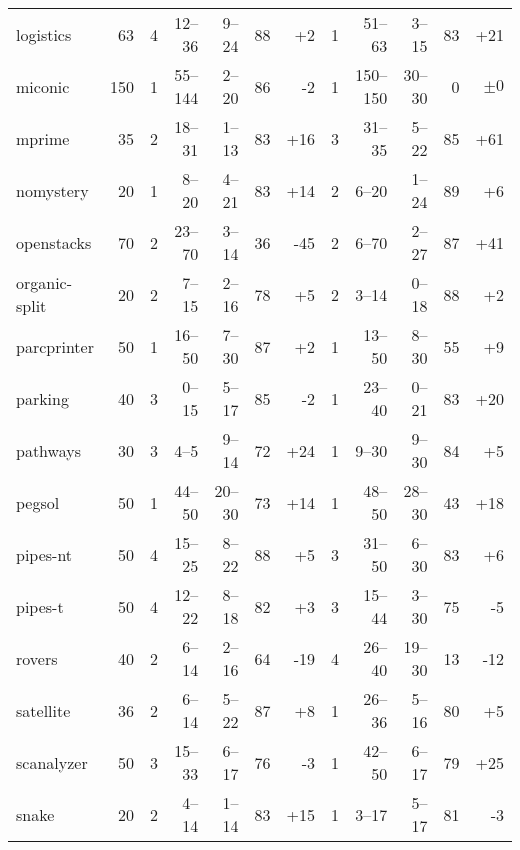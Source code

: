\documentclass{article}
\begin{document}
\begin{table}[h]
\begin{tabular}{@{}lr|rrrrr|rrrrr@{}}
    logistics &    63 &   4 &  12--36 &  9--24 & 88 &  {\color{blue}+2} &   1 &   51--63 &  3--15 & 83 & {\color{blue}+21} \\
      miconic &   150 &   1 & 55--144 &  2--20 & 86 &   {\color{red}-2} &   1 & 150--150 & 30--30 &  0 &           $\pm 0$ \\
       mprime &    35 &   2 &  18--31 &  1--13 & 83 & {\color{blue}+16} &   3 &   31--35 &  5--22 & 85 & {\color{blue}+61} \\
    nomystery &    20 &   1 &   8--20 &  4--21 & 83 & {\color{blue}+14} &   2 &    6--20 &  1--24 & 89 &  {\color{blue}+6} \\
   openstacks &    70 &   2 &  23--70 &  3--14 & 36 &  {\color{red}-45} &   2 &    6--70 &  2--27 & 87 & {\color{blue}+41} \\
organic-split &    20 &   2 &   7--15 &  2--16 & 78 &  {\color{blue}+5} &   2 &    3--14 &  0--18 & 88 &  {\color{blue}+2} \\
  parcprinter &    50 &   1 &  16--50 &  7--30 & 87 &  {\color{blue}+2} &   1 &   13--50 &  8--30 & 55 &  {\color{blue}+9} \\
      parking &    40 &   3 &   0--15 &  5--17 & 85 &   {\color{red}-2} &   1 &   23--40 &  0--21 & 83 & {\color{blue}+20} \\
     pathways &    30 &   3 &    4--5 &  9--14 & 72 & {\color{blue}+24} &   1 &    9--30 &  9--30 & 84 &  {\color{blue}+5} \\
       pegsol &    50 &   1 &  44--50 & 20--30 & 73 & {\color{blue}+14} &   1 &   48--50 & 28--30 & 43 & {\color{blue}+18} \\
     pipes-nt &    50 &   4 &  15--25 &  8--22 & 88 &  {\color{blue}+5} &   3 &   31--50 &  6--30 & 83 &  {\color{blue}+6} \\
      pipes-t &    50 &   4 &  12--22 &  8--18 & 82 &  {\color{blue}+3} &   3 &   15--44 &  3--30 & 75 &   {\color{red}-5} \\
       rovers &    40 &   2 &   6--14 &  2--16 & 64 &  {\color{red}-19} &   4 &   26--40 & 19--30 & 13 &  {\color{red}-12} \\
    satellite &    36 &   2 &   6--14 &  5--22 & 87 &  {\color{blue}+8} &   1 &   26--36 &  5--16 & 80 &  {\color{blue}+5} \\
   scanalyzer &    50 &   3 &  15--33 &  6--17 & 76 &   {\color{red}-3} &   1 &   42--50 &  6--17 & 79 & {\color{blue}+25} \\
        snake &    20 &   2 &   4--14 &  1--14 & 83 & {\color{blue}+15} &   1 &    3--17 &  5--17 & 81 &   {\color{red}-3} \\

\end{tabular}
\end{table}
\end{document}
